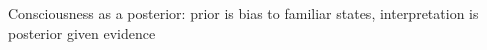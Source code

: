 \documentclass[11pt,letterpaper]{article}
\begin{document}
Consciousness as a posterior: prior is bias to familiar states, interpretation
is posterior given evidence








\small

\end{document}
